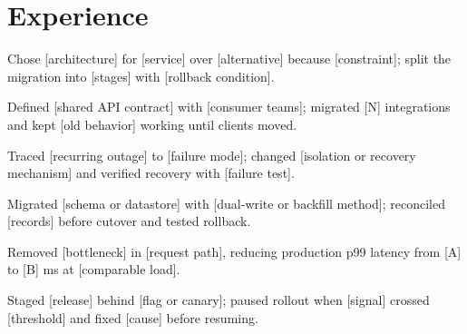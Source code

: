 \documentclass{resume}
\begin{document}

\section{Experience}

\begin{jobduties}
  \item Chose [architecture] for [service] over [alternative] because [constraint]; split the migration into [stages] with [rollback condition].
  \item Defined [shared API contract] with [consumer teams]; migrated [N] integrations and kept [old behavior] working until clients moved.
\end{jobduties}
\begin{jobduties}
  \item Traced [recurring outage] to [failure mode]; changed [isolation or recovery mechanism] and verified recovery with [failure test].
\end{jobduties}

\begin{jobduties}
  \item Migrated [schema or datastore] with [dual-write or backfill method]; reconciled [records] before cutover and tested rollback.
  \item Removed [bottleneck] in [request path], reducing production p99 latency from [A] to [B] ms at [comparable load].
  \item Staged [release] behind [flag or canary]; paused rollout when [signal] crossed [threshold] and fixed [cause] before resuming.
\end{jobduties}
\end{document}
